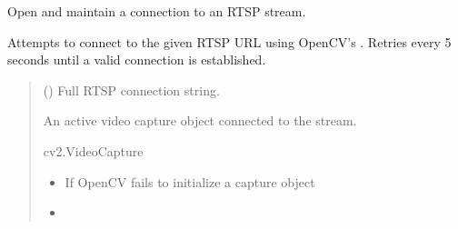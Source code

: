 \documentclass[letterpaper,10pt,english]{sphinxmanual}
\begin{document}
\begin{fulllineitems}
\label{\detokenize{modules/src.data_stream.StreamConversionServer:src.data_stream.StreamConversionServer.open_stream}}
\pysigstartsignatures
\pysiglinewithargsret
{}
{}
{}
\pysigstopsignatures
\sphinxAtStartPar
Open and maintain a connection to an RTSP stream.

\sphinxAtStartPar
Attempts to connect to the given RTSP URL using OpenCV’s
. Retries every 5 seconds until a valid
connection is established.
\begin{quote}\begin{description}
\sphinxAtStartPar
{} () \textendash{} Full RTSP connection string.

\sphinxAtStartPar
An active video capture object connected
to the stream.

\sphinxAtStartPar
cv2.VideoCapture

\begin{itemize}
\item {} 
\sphinxAtStartPar
{} \textendash{} If OpenCV fails to initialize a capture object

\item {} 
\sphinxAtStartPar
\sphinxstyleliteralstrong{\sphinxupquote{(}}\sphinxstyleliteralstrong{\sphinxupquote{, }}\sphinxstyleliteralstrong{\sphinxupquote{)}} \textendash{} 

\end{itemize}

\end{description}\end{quote}

\end{fulllineitems}

\end{document}
